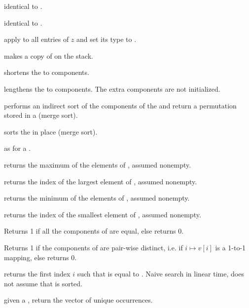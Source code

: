  identical to .

 identical to .

 apply  to all entries
of $z$ and set its type to .

 makes a copy of  on the stack.

 shortens the  
to  components.

 lengthens the 
 to  components. The extra components are not initialized.

 performs an indirect sort of the
components of the   and return a permutation stored in a
 (merge sort).

 sorts the   in place
(merge sort).

 as  for a 
.

 returns the maximum of the elements of
 , assumed nonempty.

 returns the index of the largest
element of  , assumed nonempty.

 returns the minimum of the elements of
 , assumed nonempty.

 returns the index of the smallest
element of  , assumed nonempty.

 Returns 1 if all the components of 
are equal, else returns 0.

  Returns 1 if the components of  are
pair-wise distinct, i.e. if $i\mapsto v[i]$ is a 1-to-1 mapping, else returns
0.

 returns the first index $i$
such that  is equal to . Naive search in linear time, does
not assume that  is sorted.

 given a  , return
the vector of unique occurrences.

